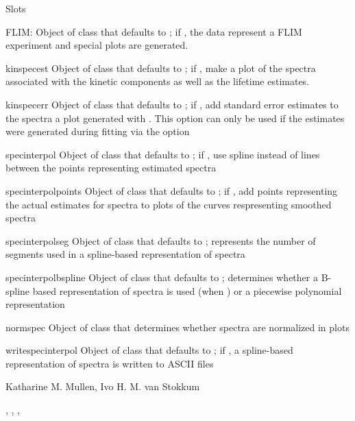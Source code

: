 \documentclass{article}
\begin{document}
\begin{Section}{Slots}
{\item[FLIM:] Object of class  that defaults to 
; if , the data represent a FLIM experiment and 
special plots are generated. 
\item[kinspecest] Object of class  that defaults to 
; if , make a plot of the spectra associated with
the kinetic components as well as the lifetime estimates. 
\item[kinspecerr] Object of class  that defaults to 
; if , add standard error estimates to the spectra
a plot generated with .  This option can only be 
used if the estimates were generated during fitting via the option 
\item[specinterpol] Object of class  that defaults to 
; if , use spline instead of lines between 
the points representing estimated spectra
\item[specinterpolpoints] Object of class  that defaults to 
; if , add points representing the actual estimates
for spectra to plots of the curves respresenting smoothed spectra
\item[specinterpolseg] Object of class  that defaults to 
; represents the number of segments used in a spline-based
representation of spectra  
\item[specinterpolbspline] Object of class  that defaults
to ; determines whether a B-spline based representation of
spectra is used (when ) or a piecewise polynomial 
representation 
\item[normspec] Object of class  that determines whether
spectra are normalized in plots

\item[writespecinterpol] Object of class  that defaults to 
; if , a spline-based representation of spectra
is written to ASCII files
}
\end{Section}
\begin{Author}\relax
Katharine M. Mullen, Ivo H. M. van Stokkum
\end{Author}
\begin{SeeAlso}\relax
{}, , , 
\end{SeeAlso}
\end{document}
